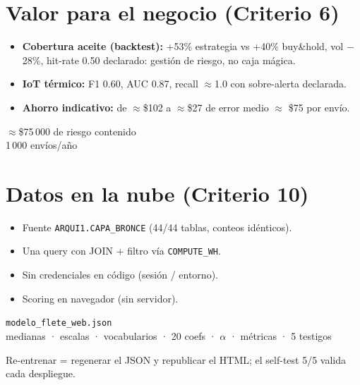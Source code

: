 \documentclass[11pt]{article}
\begin{document}
\section{Valor para el negocio (Criterio 6)}
\begin{itemize}[leftmargin=*]
\item \textbf{Cobertura aceite (backtest):} +53\% estrategia vs +40\% buy\&hold, vol $-$28\%, hit-rate 0.50 declarado: gestión de riesgo, no caja mágica.
\item \textbf{IoT térmico:} F1 0.60, AUC 0.87, recall $\approx$1.0 con sobre-alerta declarada.
\item \textbf{Ahorro indicativo:} de $\approx$\$102 a $\approx$\$27 de error medio $\approx$ \$75 por envío.
\end{itemize}
\begin{center}\begin{kpi}{$\approx$\$75\,000 de riesgo contenido}\\{\small 1\,000 envíos/año}\end{kpi}\end{center}
\section{Datos en la nube (Criterio 10)}
\begin{center}
\begin{minipage}{0.55\linewidth}
\begin{itemize}[leftmargin=*]
\item Fuente \texttt{ARQUI1.CAPA\_BRONCE} (44/44 tablas, conteos idénticos).
\item Una query con JOIN + filtro vía \texttt{COMPUTE\_WH}.
\item Sin credenciales en código (sesión / entorno).
\item Scoring en navegador (sin servidor).
\end{itemize}
\end{minipage}\hfill
\begin{minipage}{0.42\linewidth}
\begin{kpi}{\texttt{modelo\_flete\_web.json}}\\{\small medianas · escalas · vocabularios · 20 coefs · $\alpha$ · métricas · 5 testigos}\end{kpi}
\end{minipage}
\end{center}
Re-entrenar = regenerar el JSON y republicar el HTML; el self-test 5/5 valida cada despliegue.
\end{document}
